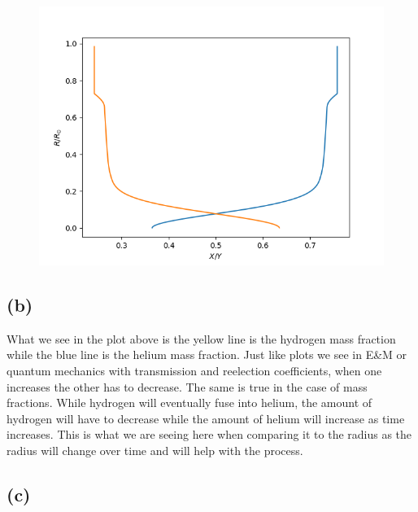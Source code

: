 \documentclass[11pt]{article}
\begin{document}
\begin{figure}[h!]
    \centering
    {{\includegraphics[width=15cm]{Figure_1.png} }}%
    \caption{}%
    \label{fig:example}%
\end{figure}

\subsection*{(b)}

What we see in the plot above is the yellow line is the hydrogen mass fraction while the blue line is the helium mass fraction. Just like plots we see in E&M or quantum mechanics with transmission and reelection coefficients, when one increases the other has to decrease. The same is true in the case of mass fractions. While hydrogen will eventually fuse into helium, the amount of hydrogen will have to decrease while the amount of helium will increase as time increases. This is what we are seeing here when comparing it to the radius as the radius will change over time and will help with the process.

\newpage

\subsection*{(c)}
\end{document}
